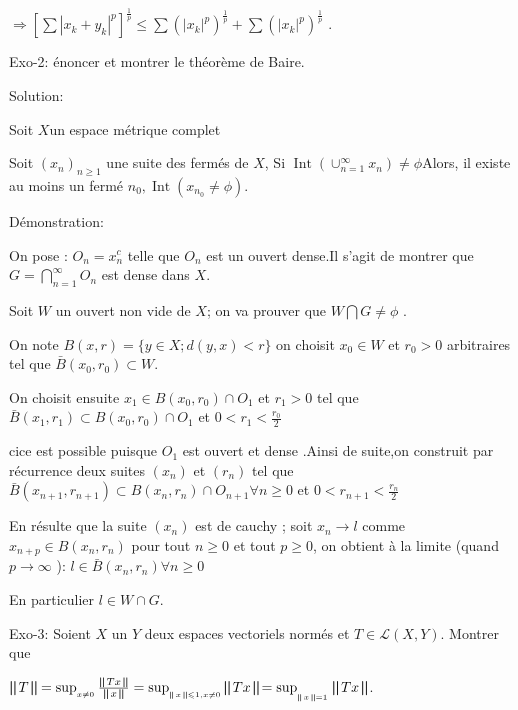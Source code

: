 \documentclass{article}
\begin{document}
$\Rightarrow \left[ \sum | x_k + y_k |^p \right]^{\frac{1}{p}} \leq \sum {(|
x_k |^p) }^{\frac{1}{p}} + \sum {(| x_k |^p) }^{\frac{1}{p}}$ .

Exo-2: {\'e}noncer et montrer le th{\'e}or{\`e}me de Baire.

Solution:

Soit $X$un espace m{\'e}trique complet

Soit $(x_n)_{n \geq 1}$ une suite des ferm{\'e}s de $X$, Si
$\ensuremath{\operatorname{Int}} (\cup^{\infty}_{n = 1} x_n) \neq \phi$Alors,
il existe au moins un ferm{\'e} $n_0, \ensuremath{\operatorname{Int}} (x_{n_0}
\neq \phi) .$

D{\'e}monstration:

On pose : $O_n = x^c_n$ telle que $O_n$ est un ouvert dense.Il s'agit de
montrer que $G = \bigcap^{\infty}_{n = 1} O_n$ est dense dans $X$.

Soit $W$ un ouvert non vide de $X$; on va prouver que $W \bigcap G \neq \phi$
.

On note $B (x, r) = \{ y \in X ; d (y, x) < r \}$ on choisit $x_0 \in W$ et
$r_0 > 0$ arbitraires tel que $\bar{B}  (x_0, r_0) \subset W .$

On choisit ensuite $x_1 \in B (x_0, r_0) \cap O_1$ et $r_1 > 0$ tel que
$\bar{B}  (x_1, r_1) \subset B (x_0, r_0) \cap O_1$ et $0 < r_1 <
\frac{r_0}{2}$

cice est possible puisque $O_1$ est ouvert et dense .Ainsi de suite,on
construit par r{\'e}currence deux suites $(x_n)$ et $(r_n)$ tel que $\bar{B} 
(x_{n + 1}, r_{n + 1}) \subset B (x_n, r_n) \cap O_{n + 1} \forall n \geq 0$
et $0 < r_{n + 1} < \frac{r_n}{2}$

En r{\'e}sulte que la suite $(x_n)$ est de cauchy ; soit $x_n \rightarrow l$
comme $x_{n + p} \in B (x_n, r_n)$ pour tout $n \geqslant 0$ et tout $p \geq
0$, on obtient {\`a} la limite (quand $p \rightarrow \infty$ ): $l \in \bar{B}
(x_n, r_n) \forall n \geq 0$

En particulier $l \in W \cap G$.

Exo-3: Soient $X$ un $Y$ deux espaces vectoriels norm{\'e}s et $T \in
\mathcal{L} (X, Y)$. Montrer que

{\hspace{11em}}$\bigparallel T \bigparallel = \sup_{_{x \neq 0}} 
\frac{\bigparallel T  x \bigparallel}{\bigparallel x \bigparallel} =
\sup_{_{\bigparallel x \bigparallel \leqslant 1, x \neq 0}}  \bigparallel T x
\bigparallel {= \sup_{_{_{\bigparallel x \bigparallel = 1}}}}_{} \bigparallel
T x \bigparallel$.
\end{document}
